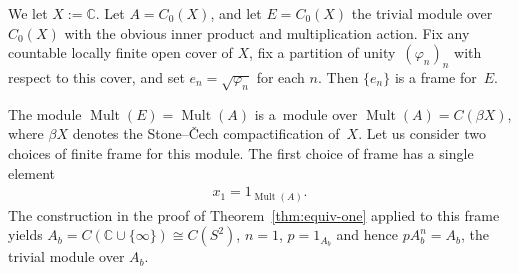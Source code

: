 \documentclass[pdftex]{sigma}
\numberwithin{equation}{section}
\DeclareMathOperator{\Mult}{Mult} %
\newcommand{\C}{\mathbb{C}} %
\begin{document}
\begin{Example}\label{ex:hopf-extends} We let $X := \C$. Let $A=C_0(X)$, and let $E=C_0(X)$ the trivial module over $C_0(X)$ with the obvious inner product and multiplication action. Fix any countable locally f\/inite open cover of $X$, f\/ix a partition of unity~$(\varphi_n)_n$ with respect to this cover, and set $e_n=\sqrt{\varphi_n}$ for each $n$. Then $\{e_n\}$ is a frame for~$E$.

The module $\Mult(E)=\Mult(A)$ is a~module over $\Mult(A)=C(\beta X)$, where $\beta X$ denotes the Stone--\v{C}ech compactif\/ication of~$X$. Let us consider two choices of f\/inite frame for this module. The f\/irst choice of frame has a single element
\begin{gather*}
x_1=1_{\Mult(A)}.
\end{gather*}
The construction in the proof of Theorem~\ref{thm:equiv-one} applied to this frame yields $A_b = C(\C \cup \{\infty\}) \cong C(S^2)$, $n = 1$, $p = 1_{A_b}$ and hence $p A_b^n = A_b$, the trivial module over $A_b$.


\end{Example}
\end{document}

